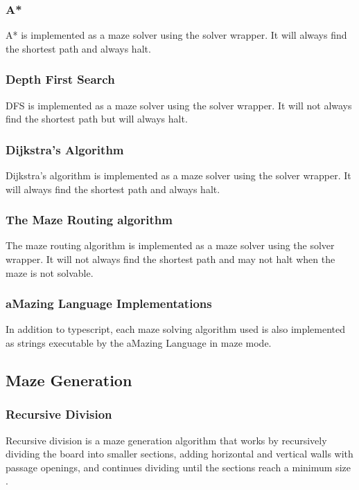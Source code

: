 \subsubsection{A*}

A* \cite{a-star-alg} is implemented as a maze solver using the solver wrapper. It will always find the shortest path and always halt.

\subsubsection{Depth First Search}

DFS \cite{pkd} is implemented as a maze solver using the solver wrapper. It will not always find the shortest path but will always halt.

\subsubsection{Dijkstra's Algorithm}

Dijkstra's algorithm \cite{dijkstras-alg} is implemented as a maze solver using the solver wrapper. It will always find the shortest path and always halt.

\subsubsection{The Maze Routing algorithm}

The maze routing algorithm \cite{maze-routing-alg} is implemented as a maze solver using the solver wrapper. It will not always find the shortest path and may not halt when the maze is not solvable.

\subsubsection{aMazing Language Implementations}

In addition to typescript, each maze solving algorithm used is also implemented as strings executable by the aMazing Language in maze mode.

\subsection{Maze Generation}
\subsubsection{Recursive Division}
Recursive division is a maze generation algorithm that works by recursively dividing the board into smaller sections, adding horizontal and vertical walls with passage openings, and continues dividing until the sections reach a minimum size \cite{recursive-division-alg}.

